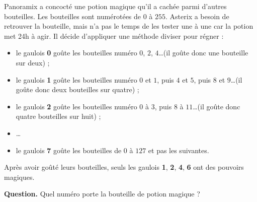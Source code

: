 \documentclass[class=report,crop=false, 12pt]{standalone}
\begin{document}
\begin{enigme}



Panoramix a concocté une potion magique qu'il a cachée parmi d'autres bouteilles.
Les bouteilles sont numérotées de $0$ à $255$.
Asterix a besoin de retrouver la bouteille, mais n'a pas le temps de les tester une à une car la potion met 24h à agir. Il décide d'appliquer une méthode \og{}diviser pour régner\fg{} :
\begin{itemize}
  \item le gaulois \textbf{0} goûte les bouteilles numéro $0$, $2$, $4$\ldots (il goûte donc une bouteille sur deux) ;
  \item le gaulois \textbf{1} goûte les bouteilles numéro $0$ et $1$, puis $4$ et $5$, puis $8$ et $9$\ldots (il goûte donc deux bouteilles sur quatre) ;
  \item le gaulois \textbf{2} goûte les bouteilles numéro $0$ à $3$,  puis $8$ à $11$\ldots (il goûte donc quatre bouteilles sur huit) ; 
  \item \ldots  
  \item le gaulois \textbf{7} goûte les bouteilles de $0$ à $127$ et pas les suivantes.
\end{itemize}

Après avoir goûté leurs bouteilles, seuls les gaulois \textbf{1}, \textbf{2}, \textbf{4}, \textbf{6} ont des pouvoirs magiques.

 
\bigskip

\textbf{Question.} Quel numéro porte la bouteille de potion magique ?



\end{enigme}
\end{document}
